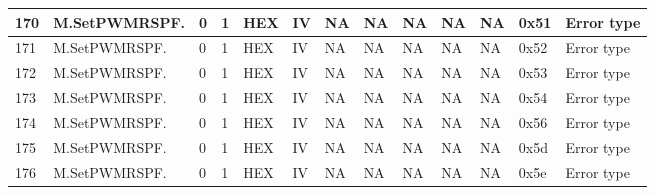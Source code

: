 {\begin{longtable}{|l|l|l|l|l|l|l|l|l|l|l|l|p{}|}
170 & M.SetPWMRSPF. & 0 & 1 & HEX & IV & NA & NA & NA & NA & NA & 0x51 & Error type\\ \hline
171 & M.SetPWMRSPF. & 0 & 1 & HEX & IV & NA & NA & NA & NA & NA & 0x52 & Error type\\ \hline
172 & M.SetPWMRSPF. & 0 & 1 & HEX & IV & NA & NA & NA & NA & NA & 0x53 & Error type\\ \hline
173 & M.SetPWMRSPF. & 0 & 1 & HEX & IV & NA & NA & NA & NA & NA & 0x54 & Error type\\ \hline
174 & M.SetPWMRSPF. & 0 & 1 & HEX & IV & NA & NA & NA & NA & NA & 0x56 & Error type\\ \hline
175 & M.SetPWMRSPF. & 0 & 1 & HEX & IV & NA & NA & NA & NA & NA & 0x5d & Error type\\ \hline
176 & M.SetPWMRSPF. & 0 & 1 & HEX & IV & NA & NA & NA & NA & NA & 0x5e & Error type \\ \hline
\end{longtable}}
